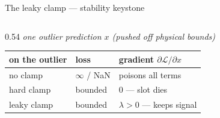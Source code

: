 \begin{frame}{The leaky clamp --- stability keystone}
\begin{columns}[c]
\begin{column}{0.54\textwidth}
      \vspace{12pt}
      {\scriptsize\itshape one outlier prediction $x$ (pushed off physical bounds)}\\[3pt]
      {\scriptsize
      \renewcommand{\arraystretch}{1.1}
      \setlength{\tabcolsep}{6pt}
      \begin{tabular}{@{}lll@{}}
        \toprule
        on the outlier & loss & gradient $\partial\mathcal{L}/\partial x$ \\
        \midrule
        no clamp   & \textcolor{accent}{$\infty$ / NaN} & \textcolor{accent}{poisons all terms} \\
        hard clamp & \textcolor{good}{bounded}          & \textcolor{accent}{$0$ --- slot dies} \\
        \rowcolor{good!12} leaky clamp & \textcolor{good}{bounded}
                   & \textcolor{good}{$\lambda\!>\!0$ --- keeps signal} \\
        \bottomrule
      \end{tabular}}


\end{column}
\end{columns}
\end{frame}
